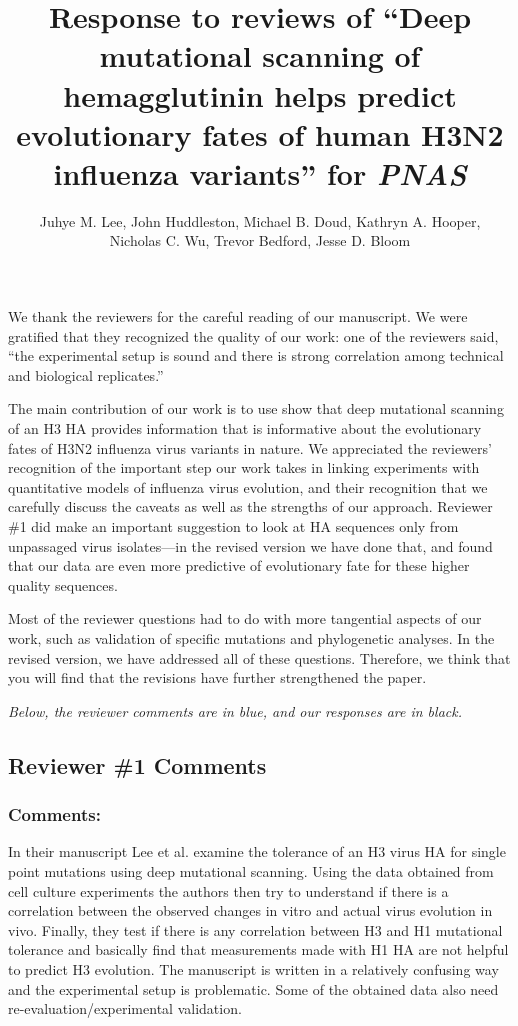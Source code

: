 \documentclass[11pt, oneside]{article}   	%
\title{Response to reviews of ``Deep mutational scanning of hemagglutinin helps predict evolutionary fates of human H3N2 influenza variants'' for \textit{PNAS}}
\author{Juhye M. Lee, John Huddleston, Michael B. Doud, Kathryn A. Hooper,\\Nicholas C. Wu, Trevor Bedford, Jesse D. Bloom}
\begin{document}
\maketitle

We thank the reviewers for the careful reading of our manuscript.
We were gratified that they recognized the quality of our work: one of the reviewers said, ``the experimental setup is sound and there is strong correlation among technical and biological replicates.''

The main contribution of our work is to use show that deep mutational scanning of an H3 HA provides information that is informative about the evolutionary fates of H3N2 influenza virus variants in nature.
We appreciated the reviewers' recognition of the important step our work takes in linking experiments with quantitative models of influenza virus evolution, and their recognition that we carefully discuss the caveats as well as the strengths of our approach.
Reviewer \#1 did make an important suggestion to look at HA sequences only from unpassaged virus isolates---in the revised version we have done that, and found that our data are even more predictive of evolutionary fate for these higher quality sequences.

Most of the reviewer questions had to do with more tangential aspects of our work, such as validation of specific mutations and phylogenetic analyses.
In the revised version, we have addressed all of these questions.
Therefore, we think that you will find that the revisions have further strengthened the paper.

\emph{Below, the reviewer comments {\color{blue} are in blue}, and our responses are in black.}

\color{blue}

\subsection*{Reviewer \#1 Comments}

\subsubsection*{Comments:} 
In their manuscript Lee et al. examine the tolerance of an H3 virus HA for single point mutations using deep mutational scanning. Using the data obtained from cell culture experiments the authors then try to understand if there is a correlation between the observed changes in vitro and actual virus evolution in vivo. Finally, they test if there is any correlation between H3 and H1 mutational tolerance and basically find that measurements made with H1 HA are not helpful to predict H3 evolution. The manuscript is written in a relatively confusing way and the experimental setup is problematic. Some of the obtained data also need re-evaluation/experimental validation. 
\end{document}
